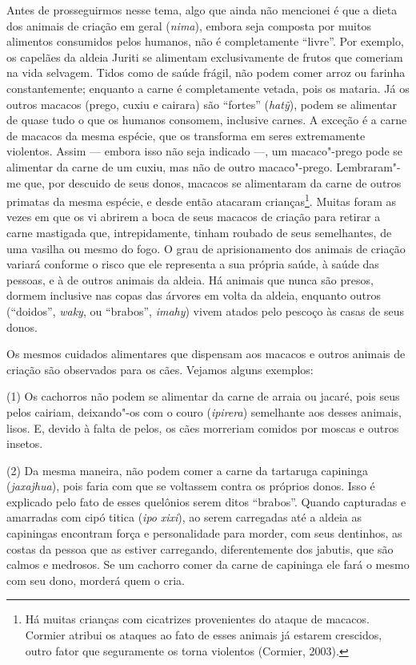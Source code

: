 Antes de prosseguirmos nesse tema, algo que ainda não mencionei é que a
dieta dos animais de criação em geral (\emph{nima}), embora seja
composta por muitos alimentos consumidos pelos humanos, não é
completamente ``livre''. Por exemplo, os capelães da aldeia Juriti se
alimentam exclusivamente de frutos que comeriam na vida selvagem. Tidos
como de saúde frágil, não podem comer arroz ou farinha constantemente;
enquanto a carne é completamente vetada, pois os mataria. Já os outros
macacos (prego, cuxiu e cairara) são ``fortes'' (\emph{hatỹ}), podem se
alimentar de quase tudo o que os humanos consomem, inclusive carnes. A
exceção é a carne de macacos da mesma espécie, que os transforma em
seres extremamente violentos. Assim --- embora isso não seja indicado ---,
um macaco"-prego pode se alimentar da carne de um cuxiu, mas não de outro
macaco"-prego. Lembraram"-me que, por descuido de seus donos, macacos se
alimentaram da carne de outros primatas da mesma espécie, e desde então
atacaram crianças\footnote{Há muitas crianças com cicatrizes
  provenientes do ataque de macacos. Cormier atribui os ataques ao fato
  de esses animais já estarem crescidos, outro fator que seguramente os
  torna violentos (Cormier, 2003).}. Muitas foram as vezes em que os vi
abrirem a boca de seus macacos de criação para retirar a carne mastigada
que, intrepidamente, tinham roubado de seus semelhantes, de uma vasilha
ou mesmo do fogo. O grau de aprisionamento dos animais de criação
variará conforme o risco que ele representa a sua própria saúde, à saúde
das pessoas, e à de outros animais da aldeia. Há animais que nunca são
presos, dormem inclusive nas copas das árvores em volta da aldeia,
enquanto outros (``doidos'', \emph{waky}, ou ``brabos'', \emph{imahy}) vivem
atados pelo pescoço às casas de seus donos.

Os mesmos cuidados alimentares que dispensam aos macacos e outros
animais de criação são observados para os cães. Vejamos alguns exemplos:

(1) Os cachorros não podem se alimentar da carne de arraia ou jacaré,
pois seus pelos cairiam, deixando"-os com o couro (\emph{ipirera})
semelhante aos desses animais, lisos. E, devido à falta de pelos, os
cães morreriam comidos por moscas e outros insetos.

(2) Da mesma maneira, não podem comer a carne da tartaruga capininga
(\emph{jaxajhua}), pois faria com que se voltassem contra os próprios
donos. Isso é explicado pelo fato de esses quelônios serem ditos
``brabos''. Quando capturadas e amarradas com cipó titica (\emph{ipo}
\emph{xixi}), ao serem carregadas até a aldeia as capiningas encontram
força e personalidade para morder, com seus dentinhos, as costas da
pessoa que as estiver carregando, diferentemente dos jabutis, que são
calmos e medrosos. Se um cachorro comer da carne de capininga ele fará o
mesmo com seu dono, morderá quem o cria.

